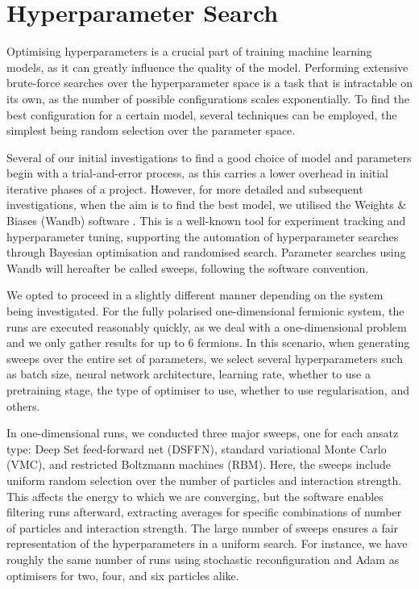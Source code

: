 \section{Hyperparameter Search}\label{met:param_search}

Optimising hyperparameters is a crucial part of training machine learning models, as it can greatly influence the quality of the model. Performing extensive brute-force searches over the hyperparameter space is a task that is intractable on its own, as the number of possible configurations scales exponentially. To find the best configuration for a certain model, several techniques can be employed, the simplest being random selection over the parameter space. 

Several of our initial investigations to find a good choice of model and parameters begin with a trial-and-error process, as this carries a lower overhead in initial iterative phases of a project. However, for more detailed and subsequent investigations, when the aim is to find the best model, we utilised the Weights \& Biases (Wandb) software \cite{wandb}. This is a well-known tool for experiment tracking and hyperparameter tuning, supporting the automation of hyperparameter searches through Bayesian optimisation and randomised search. Parameter searches using Wandb will hereafter be called sweeps, following the software convention.

We opted to proceed in a slightly different manner depending on the system being investigated. For the fully polarised one-dimensional fermionic system, the runs are executed reasonably quickly, as we deal with a one-dimensional problem and we only gather results for up to 6 fermions. In this scenario, when generating sweeps over the entire set of parameters, we select several hyperparameters such as batch size, neural network architecture, learning rate, whether to use a pretraining stage, the type of optimiser to use, whether to use regularisation, and others.

In one-dimensional runs, we conducted three major sweeps, one for each ansatz type: Deep Set feed-forward net (DSFFN), standard variational Monte Carlo (VMC), and restricted Boltzmann machines (RBM). Here, the sweeps include uniform random selection over the number of particles and interaction strength. This affects the energy to which we are converging, but the software enables filtering runs afterward, extracting averages for specific combinations of number of particles and interaction strength. The large number of sweeps ensures a fair representation of the hyperparameters in a uniform search. For instance, we have roughly the same number of runs using stochastic reconfiguration and Adam as optimisers for two, four, and six particles alike.

